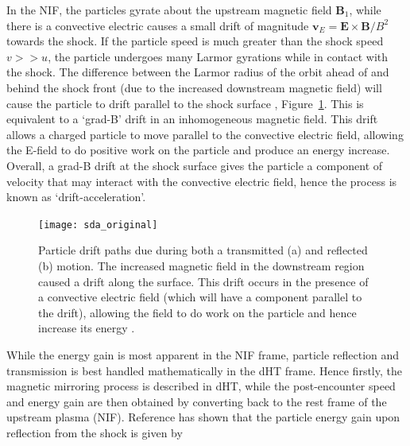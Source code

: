 In the NIF, the particles gyrate about the upstream magnetic field $\mathbf{B}_1$, while there is a convective electric causes a small drift of magnitude $\mathbf{v}_E = \mathbf{E}\times \mathbf{B}/B^2$ towards the shock. If the particle speed is much greater than the shock speed $v>>u$, the particle undergoes many Larmor gyrations while in contact with the shock. The difference between the Larmor radius of the orbit ahead of and behind the shock front (due to the increased downstream magnetic field) will cause the particle to drift parallel to the shock surface \citep{ball2001, toptychin1980}, Figure~\ref{fig:sda}. This is equivalent to a \textquoteleft grad-B' drift in an inhomogeneous magnetic field. This drift allows a charged particle to move parallel to the convective electric field, allowing the E-field to do positive work on the particle and produce an energy increase. Overall, a grad-B drift at the shock surface gives the particle a component of velocity that may interact with the convective electric field, hence the process is known as \textquoteleft drift-acceleration'.

\begin{figure}[!t] 
\begin{center}
\texttt{[image: sda\_original]}
\caption[Shock drift acceleration]{Particle drift paths due during both a transmitted (a) and reflected (b) motion. The increased magnetic field in the downstream region caused a drift along the surface. This drift occurs in the presence of a convective electric field (which will have a component parallel to the drift), allowing the field to do work on the particle and hence increase its energy \citep{ball2001}.}
\label{fig:sda}
\end{center}
\end{figure}

While the energy gain is most apparent in the NIF frame, particle reflection and transmission is best handled mathematically in the dHT frame. Hence firstly, the magnetic mirroring process is described in dHT, while the post-encounter speed and energy gain are then obtained by converting back to the rest frame of the upstream plasma (NIF). Reference has shown that the particle energy gain upon reflection from the shock is given by 

